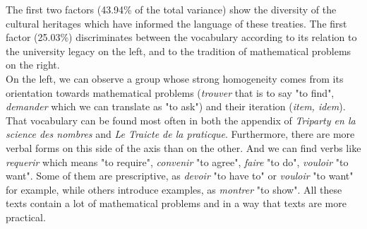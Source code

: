\documentclass[preprint]{elsarticle}
\begin{document}
%
%
%
%
%

The first two factors (43.94\% of the total variance) show the diversity of the cultural heritages which have informed the language of these treaties. The first factor (25.03\%) discriminates between the vocabulary according to its relation to the university legacy on the left, and to the tradition of mathematical problems on the right.\\

On the left, we can observe a group whose strong homogeneity comes from its orientation towards mathematical problems (\textit{trouver} that is to say "to find", \textit{demander} which we can translate as "to ask") and their iteration (\textit{item, idem}). That vocabulary can be found most often in both the appendix of \textit{Triparty en la science des nombres} and \textit{Le Traicte de la praticque}. Furthermore, there are more verbal forms on this side of the axis than on the other. And we can find verbs like \textit{requerir} which means "to require", \textit{convenir} "to agree", \textit{faire} "to do", \textit{vouloir} "to want". Some of them are prescriptive, as \textit{devoir} "to have to" or \textit{vouloir} "to want" for example, while others introduce examples, as \textit{montrer} "to show". All these texts contain a lot of mathematical problems and in a way that texts are more practical.\\
\end{document}
